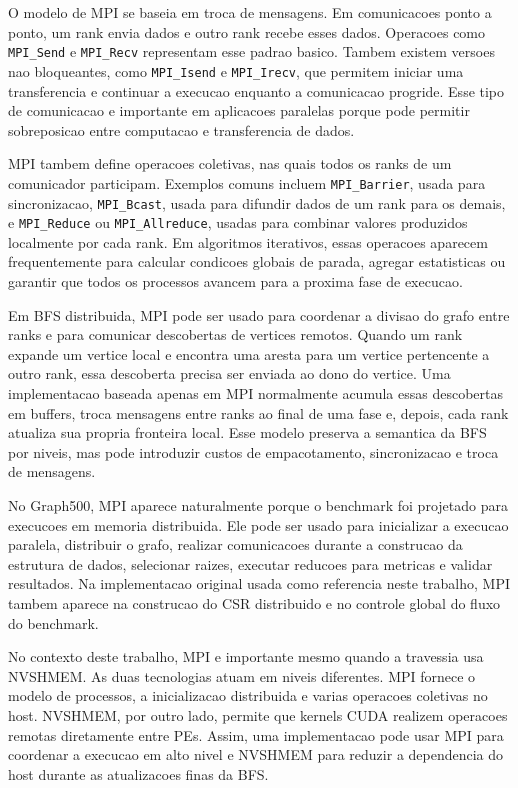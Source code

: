 \documentclass{article}
\begin{document}
O modelo de MPI se baseia em troca de mensagens. Em comunicacoes ponto a ponto,
um rank envia dados e outro rank recebe esses dados. Operacoes como
\texttt{MPI\_Send} e \texttt{MPI\_Recv} representam esse padrao basico. Tambem
existem versoes nao bloqueantes, como \texttt{MPI\_Isend} e
\texttt{MPI\_Irecv}, que permitem iniciar uma transferencia e continuar a
execucao enquanto a comunicacao progride. Esse tipo de comunicacao e importante
em aplicacoes paralelas porque pode permitir sobreposicao entre computacao e
transferencia de dados.

MPI tambem define operacoes coletivas, nas quais todos os ranks de um
comunicador participam. Exemplos comuns incluem \texttt{MPI\_Barrier}, usada
para sincronizacao, \texttt{MPI\_Bcast}, usada para difundir dados de um rank
para os demais, e \texttt{MPI\_Reduce} ou \texttt{MPI\_Allreduce}, usadas para
combinar valores produzidos localmente por cada rank. Em algoritmos iterativos,
essas operacoes aparecem frequentemente para calcular condicoes globais de
parada, agregar estatisticas ou garantir que todos os processos avancem para a
proxima fase de execucao.

Em BFS distribuida, MPI pode ser usado para coordenar a divisao do grafo entre
ranks e para comunicar descobertas de vertices remotos. Quando um rank expande
um vertice local e encontra uma aresta para um vertice pertencente a outro rank,
essa descoberta precisa ser enviada ao dono do vertice. Uma implementacao baseada
apenas em MPI normalmente acumula essas descobertas em buffers, troca mensagens
entre ranks ao final de uma fase e, depois, cada rank atualiza sua propria
fronteira local. Esse modelo preserva a semantica da BFS por niveis, mas pode
introduzir custos de empacotamento, sincronizacao e troca de mensagens.

No Graph500, MPI aparece naturalmente porque o benchmark foi projetado para
execucoes em memoria distribuida. Ele pode ser usado para inicializar a execucao
paralela, distribuir o grafo, realizar comunicacoes durante a construcao da
estrutura de dados, selecionar raizes, executar reducoes para metricas e validar
resultados. Na implementacao original usada como referencia neste trabalho, MPI
tambem aparece na construcao do CSR distribuido e no controle global do fluxo do
benchmark.

No contexto deste trabalho, MPI e importante mesmo quando a travessia usa
NVSHMEM. As duas tecnologias atuam em niveis diferentes. MPI fornece o modelo de
processos, a inicializacao distribuida e varias operacoes coletivas no host.
NVSHMEM, por outro lado, permite que kernels CUDA realizem operacoes remotas
diretamente entre PEs. Assim, uma implementacao pode usar MPI para coordenar a
execucao em alto nivel e NVSHMEM para reduzir a dependencia do host durante as
atualizacoes finas da BFS.
\end{document}
